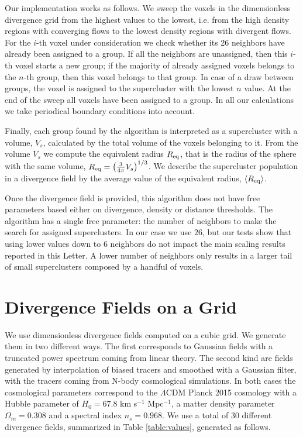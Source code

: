 \documentclass[usenatbib]{mnras}
\begin{document}
Our implementation works as follows. 
We sweep the voxels in the dimensionless divergence grid from the highest values to the lowest, i.e. from the high density regions with converging flows to the lowest density regions with divergent flows.
For the $i$-th voxel under consideration we check whether its 26 neighbors have already been assigned to a group. 
If all the neighbors are unassigned, then this $i$-th voxel starts a new group; if the majority of already assigned voxels belongs to the $n$-th group, then this voxel belongs to that group.
In case of a draw between groups, the voxel is assigned to the supercluster with the lowest $n$ value.
At the end of the sweep all voxels have been assigned to a group. 
In all our calculations we take periodical boundary conditions into account.  

Finally, each group found by the algorithm is interpreted as a supercluster 
with a volume, $V_s$, calculated by the total volume of the voxels belonging to it.
From the volume $V_s$ we compute the equivalent radius $R_{\rm eq}$, that is the radius of the sphere with the same volume, 
   $ R_{\rm eq} = \left(\frac{3}{4\pi}V_{s}\right)^{1/3}$.
We describe the supercluster population in a divergence field by the average value of the equivalent radius, $\langle R_{\rm eq}\rangle$.

Once the divergence field is provided, this algorithm  does not have free parameters based either on divergence, density or distance thresholds. 
The algorithm has a single free parameter: the number of neighbors to make the search for assigned superclusters.
In our case we use $26$, but our tests show that using lower values down to $6$ neighbors do not impact the main scaling results reported in this Letter. 
A lower number of neighbors only results in a larger tail of small superclusters composed by a handful of voxels.


\section{Divergence Fields on a Grid}
\label{sec:fields}

We use dimensionless divergence fields computed on a cubic grid. 
We generate them in two different ways.
The first corresponds to Gaussian fields with a truncated power spectrum coming from linear theory.
The second kind are fields generated by interpolation of biased tracers and smoothed with a Gaussian filter, with the tracers coming from N-body cosmological simulations.
In both cases the cosmological parameters correspond to the
$\Lambda$CDM Planck 2015 cosmology \citep{2016A&A...594A..13P} with a Hubble parameter of $H_0=67.8$ km s$^{-1}$ Mpc$^{-1}$, a matter density parameter $\Omega_m=0.308$ and a spectral index $n_s=0.968$.
We use a total of $30$ different divergence fields, summarized in Table \ref{table:values}, generated as follows.
\end{document}
